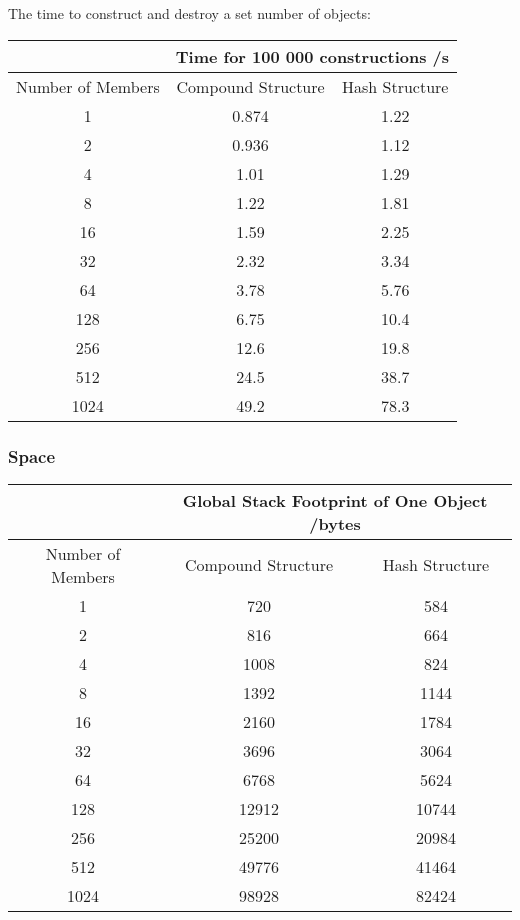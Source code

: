 \documentclass[12pt,a4paper,twoside,openright]{report}
\begin{document}
The time to construct and destroy a set number of objects:

\begin{center}
\begin{tabular}{c|c|c}

& \multicolumn{2}{c}{Time for 100 000 constructions /s} \\
\hline
Number of Members &Compound Structure & Hash Structure \\
\hline
1	&	0.874		&	1.22	\\
2	&	0.936		&	1.12	\\
4	&	1.01		&	1.29	\\
8	&	1.22		&	1.81	\\
16	&	1.59		&	2.25	\\
32	&	2.32		&	3.34	\\
64	&	3.78		&	5.76	\\
128	&	6.75		&	10.4	\\
256	&	12.6		&	19.8	\\
512	&	24.5		&	38.7	\\
1024	&	49.2		&	78.3	\\

\end{tabular}
\end{center}

\subsubsection{Space}

\begin{center}
\begin{tabular}{c|c|c}

& \multicolumn{2}{c}{Global Stack Footprint of One Object /bytes} \\
\hline
Number of Members &Compound Structure & Hash Structure \\
\hline
1	&	720		&	584	\\
2	&	816		&	664	\\
4	&	1008		&	824	\\
8	&	1392		&	1144	\\
16	&	2160		&	1784	\\
32	&	3696		&	3064	\\
64	&	6768		&	5624	\\
128	&	12912		&	10744	\\
256	&	25200		&	20984	\\
512	&	49776		&	41464	\\
1024	&	98928		&	82424	\\

\end{tabular}
\end{center}
\end{document}
